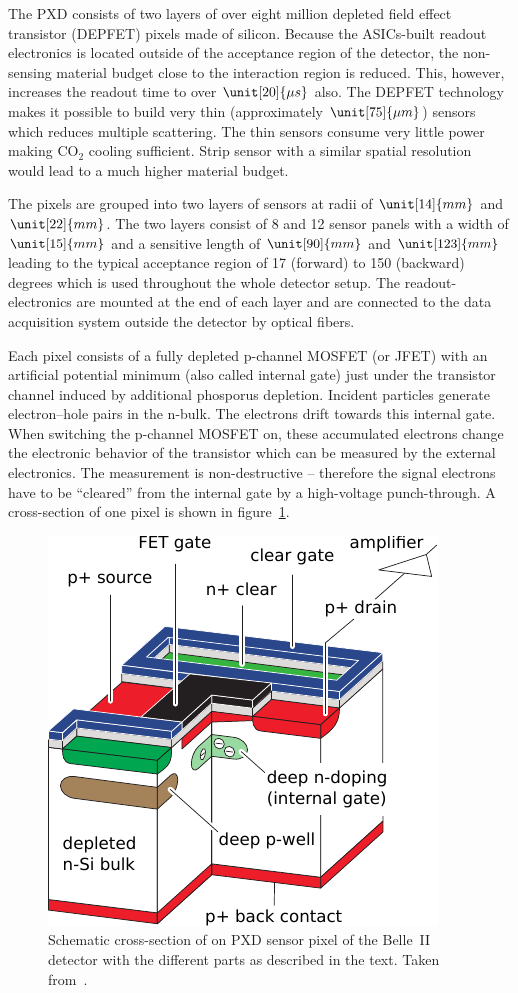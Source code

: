 The PXD consists of two layers of over eight million depleted field effect transistor (DEPFET) pixels made of silicon. Because the ASICs-built readout electronics is located outside of the acceptance region of the detector, the non-sensing material budget close to the interaction region is reduced. This, however, increases the readout time to over $\unit[20]{\mu s}$ also. The DEPFET technology makes it possible to build very thin (approximately $\unit[75]{\mu m}$) sensors which reduces multiple scattering. The thin sensors consume very little power making $\mathrm{CO}_2$ cooling sufficient. Strip sensor with a similar spatial resolution would lead to a much higher material budget.

The pixels are grouped into two layers of sensors at radii of $\unit[14]{mm}$ and $\unit[22]{mm}$. The two layers consist of 8 and 12 sensor panels with a width of $\unit[15]{mm}$ and a sensitive length of $\unit[90]{mm}$ and $\unit[123]{mm}$ leading to the typical acceptance region of 17 (forward) to 150 (backward) degrees which is used throughout the whole detector setup. The readout-electronics are mounted at the end of each layer and are connected to the data acquisition system outside the detector by optical fibers.

Each pixel consists of a fully depleted p-channel MOSFET (or JFET) with an artificial potential minimum (also called internal gate) just under the transistor channel induced by additional phosporus depletion. Incident particles generate electron--hole pairs in the n-bulk. The electrons drift towards this internal gate. When switching the p-channel MOSFET on, these accumulated electrons change the electronic behavior of the transistor which can be measured by the external electronics. The measurement is non-destructive -- therefore the signal electrons have to be ``cleared'' from the internal gate by a high-voltage punch-through. A cross-section of one pixel is shown in figure~\ref{fig-pxd-schema}.

\begin{figure}
  \centering
  \includegraphics[width=0.6\linewidth]{figures/experimental_setup/pxd.pdf}
  \caption[Cross-section of a PXD sensor]{Schematic cross-section of on PXD sensor pixel of the Belle~II detector with the different parts as described in the text. Taken from~\cite{tdr}.}
  \label{fig-pxd-schema}
\end{figure}


